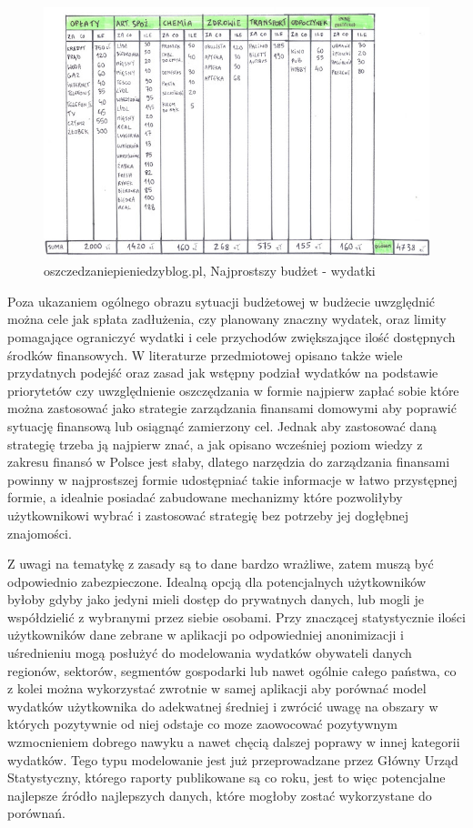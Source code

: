 \documentclass[a4paper,10pt, twoside]{report}
\begin{document}
\begin{figure}[H]           %
    \caption{oszczedzaniepieniedzyblog.pl, Najprostszy budżet - wydatki}
    \label{fig:}
    \centering  
    \includegraphics[width=12cm]{figures/oszczedzaniepieniedzyblog-pl_wydatki.jpg}
\end{figure}


{Poza ukazaniem ogólnego obrazu sytuacji budżetowej w budżecie uwzględnić można 
cele jak spłata zadłużenia, czy planowany znaczny wydatek, oraz limity 
pomagające ograniczyć wydatki i cele przychodów zwiększające ilość dostępnych 
środków finansowych. W literaturze przedmiotowej opisano także wiele przydatnych
 podejść oraz zasad jak wstępny podział wydatków na podstawie 
priorytetów\cite{najbogatszyczlowiekwbabilonie} czy uwzględnienie oszczędzania 
w formie najpierw zapłać sobie\cite{najbogatszyczlowiekwbabilonie}
\cite{finansowaforteca} które można zastosować jako strategie zarządzania 
finansami domowymi aby poprawić sytuację finansową lub osiągnąć zamierzony cel. 
Jednak aby zastosować daną strategię trzeba ją najpierw znać, a jak opisano 
wcześniej poziom wiedzy z zakresu finansó w Polsce jest słaby, dlatego narzędzia
 do zarządzania finansami powinny w najprostszej formie udostępniać takie 
informacje w łatwo przystępnej formie, a idealnie posiadać zabudowane mechanizmy
 które pozwoliłyby użytkownikowi wybrać i zastosować strategię bez potrzeby jej 
dogłębnej znajomości.}

{Z uwagi na tematykę z zasady są to dane bardzo wrażliwe, zatem muszą być 
odpowiednio zabezpieczone. Idealną opcją dla potencjalnych użytkowników byłoby 
gdyby jako jedyni mieli dostęp do prywatnych danych, lub mogli je współdzielić 
z wybranymi przez siebie osobami. Przy znaczącej statystycznie ilości 
użytkowników dane zebrane w aplikacji po odpowiedniej anonimizacji i 
uśrednieniu mogą posłużyć do modelowania wydatków obywateli danych regionów, 
sektorów, segmentów gospodarki lub nawet ogólnie całego państwa, co z kolei 
można wykorzystać zwrotnie w samej aplikacji aby porównać model wydatków 
użytkownika do adekwatnej średniej i zwrócić uwagę na obszary w których 
pozytywnie od niej odstaje co moze zaowocować pozytywnym wzmocnieniem dobrego 
nawyku a nawet chęcią dalszej poprawy w innej kategorii wydatków. Tego typu 
modelowanie jest już przeprowadzane przez Główny Urząd Statystyczny, którego 
raporty publikowane są co roku, jest to więc potencjalne najlepsze źródło 
najlepszych danych, które mogłoby zostać wykorzystane do porównań.}
\end{document}
